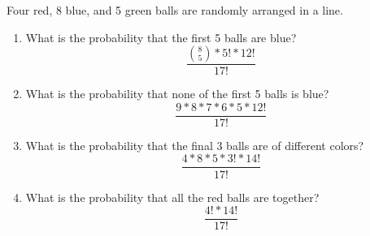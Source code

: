 \item Four red, 8 blue, and 5 green balls are randomly arranged in a line.
\begin{enumerate}
    \item What is the probability that the first 5 balls are blue?
    \[ \frac{\binom{8}{5} * 5! * 12!}{17!} \]
    \item What is the probability that none of the first 5 balls is blue?
    \[ \frac{9 * 8 * 7 * 6 * 5 * 12!}{17!} \]
    \item What is the probability that the final 3 balls are of different colors?
    \[ \frac{4 * 8 * 5 * 3! * 14!}{17!} \]
    \item What is the probability that all the red balls are together?
    \[ \frac{4! * 14!}{17!} \]
\end{enumerate}